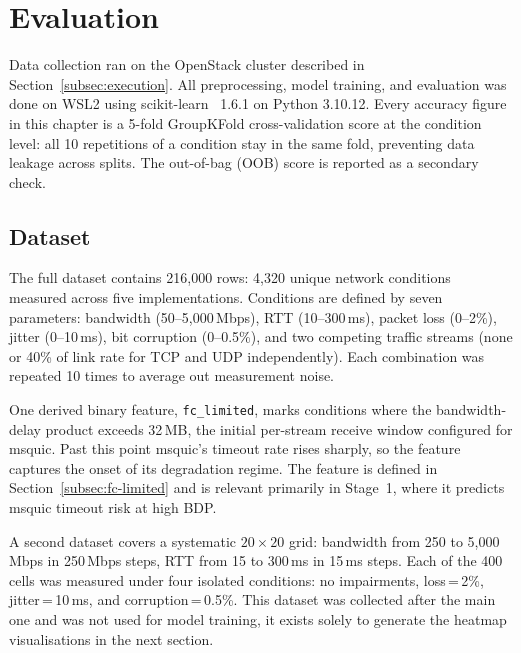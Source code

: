 \chapter{Evaluation}
\label{chapter:evaluation}

Data collection ran on the OpenStack cluster described in
Section~\ref{subsec:execution}. All preprocessing, model training, and
evaluation was done on WSL2 using scikit-learn~\cite{scikit-learn} 1.6.1 on
Python 3.10.12. Every accuracy figure in this chapter is a 5-fold
GroupKFold cross-validation score at the condition level: all 10 repetitions
of a condition stay in the same fold, preventing data leakage across splits.
The out-of-bag (OOB) score is reported as a secondary check.

\section{Dataset}
\label{sec:dataset}

The full dataset contains 216,000 rows: 4,320 unique network conditions
measured across five implementations. Conditions are defined by seven
parameters: bandwidth (50--5,000\,Mbps), RTT (10--300\,ms), packet loss
(0--2\%), jitter (0--10\,ms), bit corruption (0--0.5\%), and two competing
traffic streams (none or 40\% of link rate for TCP and UDP independently).
Each combination was repeated 10 times to average out measurement noise.

One derived binary feature, \texttt{fc\_limited}, marks conditions where the
bandwidth-delay product exceeds 32\,MB, the initial per-stream receive window
configured for msquic. Past this point msquic's timeout rate rises sharply,
so the feature captures the onset of its degradation regime. The feature is
defined in Section~\ref{subsec:fc-limited} and is relevant primarily in Stage~1,
where it predicts msquic timeout risk at high BDP.

A second dataset covers a systematic $20\times 20$ grid: bandwidth from 250
to 5,000\,Mbps in 250\,Mbps steps, RTT from 15 to 300\,ms in 15\,ms steps.
Each of the 400 cells was measured under four isolated conditions: no
impairments, loss\,=\,2\%, jitter\,=\,10\,ms, and corruption\,=\,0.5\%.
This dataset was collected after the main one and was not used for model
training, it exists solely to generate the heatmap visualisations in the
next section.

